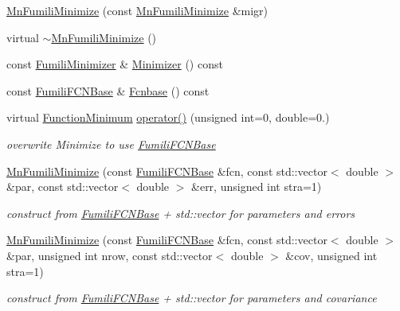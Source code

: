 \begin{DoxyCompactItemize}
\mbox{\hyperlink{classROOT_1_1Minuit2_1_1MnFumiliMinimize_a082eb87753b71a4d383ff8d735dc8410}{Mn\+Fumili\+Minimize}} (const \mbox{\hyperlink{classROOT_1_1Minuit2_1_1MnFumiliMinimize}{Mn\+Fumili\+Minimize}} \&migr)
\item 
virtual \mbox{\hyperlink{classROOT_1_1Minuit2_1_1MnFumiliMinimize_ab999713e15397b9373551207f05786c5}{$\sim$\+Mn\+Fumili\+Minimize}} ()
\item 
const \mbox{\hyperlink{classROOT_1_1Minuit2_1_1FumiliMinimizer}{Fumili\+Minimizer}} \& \mbox{\hyperlink{classROOT_1_1Minuit2_1_1MnFumiliMinimize_a96eb0cf96ae7ec874f912b6d2b3e7990}{Minimizer}} () const
\item 
const \mbox{\hyperlink{classROOT_1_1Minuit2_1_1FumiliFCNBase}{Fumili\+F\+C\+N\+Base}} \& \mbox{\hyperlink{classROOT_1_1Minuit2_1_1MnFumiliMinimize_a4540fd0311c15810965864988d4c70d1}{Fcnbase}} () const
\item 
virtual \mbox{\hyperlink{classROOT_1_1Minuit2_1_1FunctionMinimum}{Function\+Minimum}} \mbox{\hyperlink{classROOT_1_1Minuit2_1_1MnFumiliMinimize_a58da42cb9def0b42c424a3121987e77b}{operator()}} (unsigned int=0, double=0.)
\begin{DoxyCompactList}\small\item\em overwrite Minimize to use \mbox{\hyperlink{classROOT_1_1Minuit2_1_1FumiliFCNBase}{Fumili\+F\+C\+N\+Base}} \end{DoxyCompactList}\item 
\mbox{\hyperlink{classROOT_1_1Minuit2_1_1MnFumiliMinimize_a2e8cffba3a44be7488ead2240a1d3149}{Mn\+Fumili\+Minimize}} (const \mbox{\hyperlink{classROOT_1_1Minuit2_1_1FumiliFCNBase}{Fumili\+F\+C\+N\+Base}} \&fcn, const std\+::vector$<$ double $>$ \&par, const std\+::vector$<$ double $>$ \&err, unsigned int stra=1)
\begin{DoxyCompactList}\small\item\em construct from \mbox{\hyperlink{classROOT_1_1Minuit2_1_1FumiliFCNBase}{Fumili\+F\+C\+N\+Base}} + std\+::vector for parameters and errors \end{DoxyCompactList}\item 
\mbox{\hyperlink{classROOT_1_1Minuit2_1_1MnFumiliMinimize_ad12e919e837251ef358a0d461355e51c}{Mn\+Fumili\+Minimize}} (const \mbox{\hyperlink{classROOT_1_1Minuit2_1_1FumiliFCNBase}{Fumili\+F\+C\+N\+Base}} \&fcn, const std\+::vector$<$ double $>$ \&par, unsigned int nrow, const std\+::vector$<$ double $>$ \&cov, unsigned int stra=1)
\begin{DoxyCompactList}\small\item\em construct from \mbox{\hyperlink{classROOT_1_1Minuit2_1_1FumiliFCNBase}{Fumili\+F\+C\+N\+Base}} + std\+::vector for parameters and covariance \end{DoxyCompactList}\item 

\end{DoxyCompactItemize}
